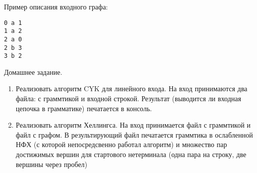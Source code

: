 Пример описания входного графа:
\begin{verbatim}
0 a 1
1 a 2
2 a 0
2 b 3
3 b 2
\end{verbatim}

Домашнее задание.
\begin{enumerate}
    \item Реализовать алгоритм CYK для линейного входа. На вход принимаются два файла: с граммтикой и входной строкой. Результат (выводится ли входная цепочка в грамматике) печатается в консоль.
    \item Реализовать алгоритм Хеллингса. На вход принимается файл с граммтикой и файл с графом. В результирующий файл печатается граммтика в ослабленной НФХ (с которой непосредсвенно работал алгоритм) и множество пар достижимых вершин для стартового нетерминала (одна пара на строку, две вершины через пробел)
\end{enumerate}

